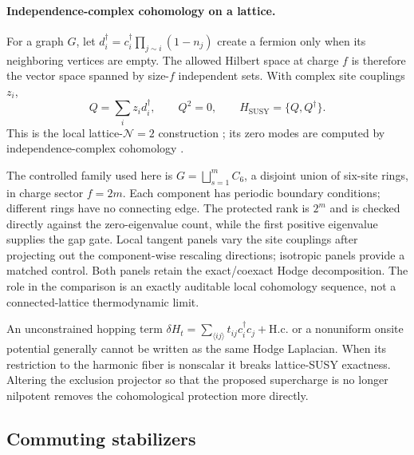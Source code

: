 \paragraph*{Independence-complex cohomology on a lattice.}
For a graph $G$, let
$d_i^\dagger=c_i^\dagger\prod_{j\sim i}(1-n_j)$ create a fermion only when its
neighboring vertices are empty.  The allowed Hilbert space at charge $f$ is
therefore the vector space spanned by size-$f$ independent sets.  With complex
site couplings $z_i$,
\begin{equation}
 Q=\sum_i z_i d_i^\dagger,
 \qquad Q^2=0,
 \qquad H_{\mathrm{SUSY}}=\{Q,Q^\dagger\}.
 \label{eq:lattice-supercharge}
\end{equation}
This is the local lattice-$\mathcal N=2$ construction
\cite{fendley2003lattice}; its zero modes are computed by
independence-complex cohomology \cite{huijse2010cohomology}.

The controlled family used here is $G=\bigsqcup_{s=1}^{m}C_6$, a disjoint
union of six-site rings, in charge sector $f=2m$.  Each component has periodic
boundary conditions; different rings have no connecting edge.  The protected
rank is $2^m$ and is checked directly against the zero-eigenvalue count, while
the first positive eigenvalue supplies the gap gate.  Local tangent panels
vary the site couplings after projecting out the component-wise rescaling
directions; isotropic panels provide a matched control.  Both panels retain
the exact/coexact Hodge decomposition.  The role in the comparison is an
exactly auditable local cohomology sequence, not a connected-lattice
thermodynamic limit.

An unconstrained hopping term
$\delta H_t=\sum_{\langle ij\rangle}t_{ij}c_i^\dagger c_j+\mathrm{H.c.}$ or a
nonuniform onsite potential generally cannot be written as the same Hodge
Laplacian.  When its restriction to the harmonic fiber is nonscalar it breaks
lattice-SUSY exactness.  Altering the exclusion projector so that the proposed
supercharge is no longer nilpotent removes the cohomological protection more
directly.

\subsection{Commuting stabilizers}

